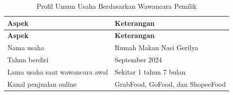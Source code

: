 \begingroup
\begin{xltabular}{\textwidth}{|Z{3.4cm}|Y|}
\caption{Profil Umum Usaha Berdasarkan Wawancara Pemilik}
\label{tab:profil_wawancara_awal} \\
        \toprule
        \textbf{Aspek}                 & \textbf{Keterangan}              \\ \hline
        \midrule
\endfirsthead
{}
        \toprule
        \textbf{Aspek}                 & \textbf{Keterangan}              \\ \hline
        \midrule
\endhead
{}
\endfoot
        \bottomrule
        \endlastfoot
        Nama usaha                     & Rumah Makan Nasi Gerilya         \\ \hline
        Tahun berdiri                  & September 2024                   \\ \hline
        Lama usaha saat wawancara awal & Sekitar 1 tahun 7 bulan          \\ \hline
        Kanal penjualan online         & GrabFood, GoFood, dan ShopeeFood \\ \hline
        \bottomrule
    
\end{xltabular}
\endgroup

